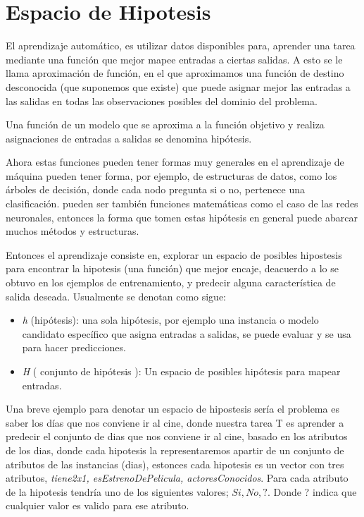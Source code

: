 \section{Espacio de Hipotesis}

El aprendizaje automático, es utilizar datos disponibles para, aprender una tarea mediante una función que mejor mapee entradas a ciertas salidas. A esto se le llama  aproximación de función, en el que aproximamos una función de destino desconocida (que suponemos que existe) que puede asignar mejor las entradas a las salidas en todas las observaciones posibles del dominio del problema.

Una función de un modelo que se aproxima a la función objetivo y realiza asignaciones de entradas a salidas se denomina hipótesis.

Ahora estas funciones pueden tener formas muy generales en el aprendizaje de máquina pueden tener forma, por ejemplo, de estructuras de datos, como los árboles de decisión, donde cada nodo pregunta si o no, pertenece una clasificación.
pueden ser también funciones matemáticas como el caso de las redes neuronales, entonces la forma que tomen estas hipótesis en general puede abarcar muchos métodos y estructuras. 

Entonces el aprendizaje consiste en, explorar un espacio de posibles hipostesis para encontrar la hipotesis (una función) que mejor encaje, deacuerdo a lo se obtuvo en los ejemplos de entrenamiento, y predecir alguna característica de salida deseada. Usualmente se denotan como sigue:

\begin{itemize}
 \item \emph{h} (hipótesis): una sola hipótesis, por ejemplo una instancia o modelo candidato específico que asigna entradas a salidas, se puede evaluar y se usa para hacer predicciones.

 \item \emph{H} ( conjunto de hipótesis ): Un espacio de posibles hipótesis para mapear entradas.
 \end{itemize}


Una breve ejemplo para denotar un espacio de hipostesis sería el problema es saber los días que nos conviene ir al cine,
donde nuestra tarea T es aprender a predecir el conjunto de dias que nos conviene ir al cine, basado en los atributos de los dias, donde cada hipotesis la representaremos apartir de un conjunto de atributos de las instancias (dias), estonces cada hipotesis es un vector con tres atributos, \emph{tiene2x1, esEstrenoDePelicula, actoresConocidos}. Para cada atributo de la hipotesis tendría uno de los siguientes valores; $Si, No, ?$. Donde ? indica que cualquier valor es valido para ese atributo.

